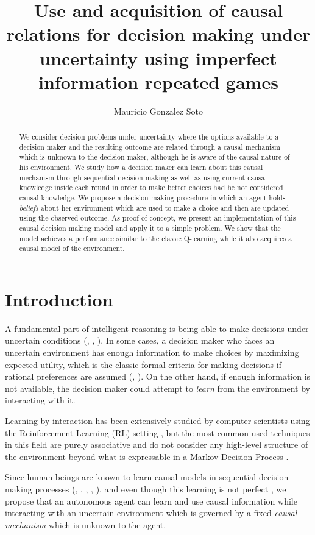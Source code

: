 \documentclass[11pt]{article}
\title{Use and acquisition of causal relations for decision making under uncertainty using imperfect information repeated games}
\author{Mauricio Gonzalez Soto}
\theoremstyle{plain}
\begin{document}
\maketitle
\tableofcontents
\newpage
\begin{abstract}
We consider decision problems under uncertainty where the options available to a decision maker and the resulting outcome are related through a causal mechanism which is unknown to the decision maker, although he is aware of the causal nature of his environment. We study how a decision maker can learn about this causal mechanism through sequential decision making as well as using current causal knowledge inside each round in order to make better choices had he not considered causal knowledge. We propose a decision making procedure in which an agent holds \textit{beliefs} about her environment which are used to make a choice and then are updated using the observed outcome. As proof of concept, we present an implementation of this causal decision making model and apply it to a simple problem. We show that the model achieves a performance similar to the classic Q-learning while it also acquires a causal model of the environment. 
\end{abstract}
\section{Introduction}
\indent A fundamental part of intelligent reasoning is being able to make decisions under uncertain conditions (\cite{danks2014unifying}, \cite{lake2017building}, \cite{pearlwhy}). In some cases, a decision maker who faces an uncertain environment has enough information to make choices by maximizing expected utility, which is the classic formal criteria for making decisions if rational preferences are assumed (\cite{bernardo2000bayesian}, \cite{gilboa2009decision}). On the other hand, if enough information is not available, the decision maker could attempt to \textit{learn} from the environment by interacting with it.

Learning by interaction has been extensively studied by computer scientists using the Reinforcement Learning (RL) setting \cite{sutton1998reinforcement}, but the most common used techniques  in this field are purely associative and do not consider any high-level structure of the environment beyond what is expressable in a Markov Decision Process \cite{garnelo2016towards}.

Since human beings are known to learn causal models in sequential decision making processes (\cite{sloman2006causal}, \cite{nichols2007decision}, \cite{meder2010observing}, \cite{hagmayer2013repeated}, \cite{danks2014unifying}), and even though this learning is not perfect \cite{rottman2014reasoning}, we propose that an autonomous agent can learn and use causal information while interacting with an uncertain environment which is governed by a fixed \textit{causal mechanism} which is unknown to the agent.  
\end{document}
